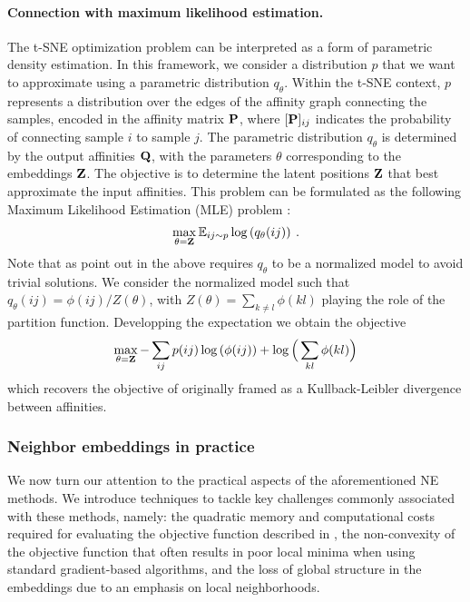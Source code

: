 \paragraph{Connection with maximum likelihood estimation.}
The t-SNE optimization problem can be interpreted as a form of parametric density estimation. In this framework, we consider a distribution $p$ that we want to approximate using a parametric distribution $q_{\theta}$. Within the t-SNE context, $p$ represents a distribution over the edges of the affinity graph connecting the samples, encoded in the affinity matrix ${\mathbf{P}}$, where $[{\mathbf{P}}]_{ij}$ indicates the probability of connecting sample $i$ to sample $j$. The parametric distribution $q_{\theta}$ is determined by the output affinities ${\mathbf{Q}}$, with the parameters $\theta$ corresponding to the embeddings ${\mathbf{Z}}$. The objective is to determine the latent positions ${\mathbf{Z}}$ that best approximate the input affinities.
This problem can be formulated as the following Maximum Likelihood Estimation (MLE) problem \citep{damrich2022t}:
\begin{align}
    \max_{\theta = {\mathbf{Z}}} \mathbb{E}_{ij \sim p} \log \left( q_{\theta}(ij) \right) \:.
\end{align}
Note that as point out in  the above requires $q_{\theta}$ to be a normalized model to avoid trivial solutions.
We consider the normalized model such that $q_{\theta}(ij) = \phi(ij) / Z(\theta)$, with $Z(\theta) = \sum_{k \neq l} \phi(kl)$ playing the role of the partition function. Developping the expectation we obtain the objective
\begin{align}
    \max_{\theta = {\mathbf{Z}}}  - \sum_{ij} p(ij) \log \left( \phi(ij) \right) + \log \Big( \sum_{kl} \phi(kl) \Big)
\end{align}
which recovers the objective of  originally framed as a Kullback-Leibler divergence between affinities.

\subsubsection{Neighbor embeddings in practice}

We now turn our attention to the practical aspects of the aforementioned NE methods. We introduce techniques to tackle key challenges commonly associated with these methods, namely: the quadratic memory and computational costs required for evaluating the objective function described in , the non-convexity of the objective function that often results in poor local minima when using standard gradient-based algorithms, and the loss of global structure in the embeddings due to an emphasis on local neighborhoods.

